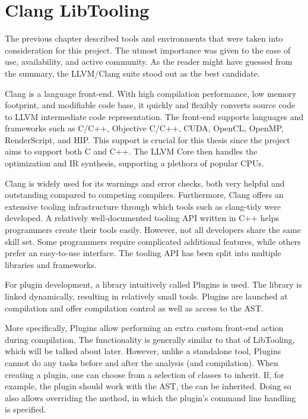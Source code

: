\chapter{Clang LibTooling}


The previous chapter described tools and environments that were taken
into consideration for this project. 
The utmost importance was given to the ease of use, availability, and 
active community. 
As the reader might have guessed from the summary, the LLVM/Clang 
suite stood out as the best candidate.

Clang is a language front-end. With high compilation performance, 
low memory footprint, and modifiable code base, it quickly and flexibly 
converts source code to LLVM intermediate code representation. 
The front-end supports languages and frameworks such as C/C++, 
Objective C/C++, CUDA, OpenCL, OpenMP, RenderScript, and HIP. 
This support is crucial for this thesis since the project 
aims to support both C and C++. 
The LLVM Core then handles the optimization and IR synthesis, 
supporting a plethora of popular CPUs.

Clang is widely used for its warnings and error checks, both very 
helpful and outstanding compared to competing compilers. 
Furthermore, Clang offers an extensive tooling infrastructure 
through which tools such as clang-tidy were developed. 
A relatively well-documented tooling API written in C++ helps 
programmers create their tools easily. 
However, not all developers share the same skill set. 
Some programmers require complicated additional features, while others 
prefer an easy-to-use interface. 
The tooling API has been split into multiple libraries and frameworks. 

For plugin development, a library intuitively called Plugins is used.
The library is linked dynamically, resulting in relatively small tools.
Plugins are launched at compilation and offer compilation control as well 
as access to the AST.

More specifically, Plugins allow performing an extra custom front-end action 
during compilation.
The functionality is generally similar to that of LibTooling, which will be 
talked about later.
However, unlike a standalone tool, Plugins cannot do any tasks before and after 
the analysis (and compilation).
When creating a plugin, one can choose from a selection of 
 classes to inherit.
If, for example, the plugin should work with the AST, 
the  can be inherited.
Doing so also allows overriding the  method, in which 
the plugin's command line handling is specified.

